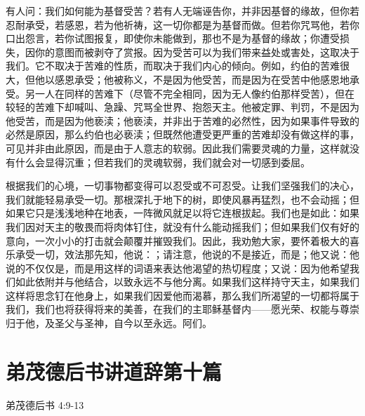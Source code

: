 有人问：我们如何能为基督受苦？若有人无端诬告你，并非因基督的缘故，但你若忍耐承受，若感恩，若为他祈祷，这一切你都是为基督而做。但若你咒骂他，若你口出怨言，若你试图报复，即使你未能做到，那也不是为基督的缘故；你遭受损失，因你的意图而被剥夺了赏报。因为受苦可以为我们带来益处或害处，这取决于我们。它不取决于苦难的性质，而取决于我们内心的倾向。例如，约伯的苦难很大，但他以感恩承受；他被称义，不是因为他受苦，而是因为在受苦中他感恩地承受。另一人在同样的苦难下（尽管不完全相同，因为无人像约伯那样受苦），但在较轻的苦难下却喊叫、急躁、咒骂全世界、抱怨天主。他被定罪、判罚，不是因为他受苦，而是因为他亵渎；他亵渎，并非出于苦难的必然性，因为如果事件导致的必然是原因，那么约伯也必亵渎；但既然他遭受更严重的苦难却没有做这样的事，可见并非由此原因，而是由于人意志的软弱。因此我们需要灵魂的力量，这样就没有什么会显得沉重；但若我们的灵魂软弱，我们就会对一切感到委屈。\par

根据我们的心境，一切事物都变得可以忍受或不可忍受。让我们坚强我们的决心，我们就能轻易承受一切。那根深扎于地下的树，即使风暴再猛烈，也不会动摇；但如果它只是浅浅地种在地表，一阵微风就足以将它连根拔起。我们也是如此：如果我们因对天主的敬畏而将肉体钉住，就没有什么能动摇我们；但如果我们仅有好的意向，一次小小的打击就会颠覆并摧毁我们。因此，我劝勉大家，要怀着极大的喜乐承受一切，效法那先知，他说：；请注意，他说的不是接近，而是；他又说：他说的不仅仅是，而是用这样的词语来表达他渴望的热切程度；又说：因为他希望我们如此依附并与他结合，以致永远不与他分离。如果我们这样持守天主，如果我们这样将思念钉在他身上，如果我们因爱他而渴慕，那么我们所渴望的一切都将属于我们，我们也将获得将来的美善，在我们的主耶稣基督内——愿光荣、权能与尊崇归于他，及圣父与圣神，自今以至永远。阿们。\par



\section{弟茂德后书讲道辞第十篇}

弟茂德后书 4:9-13\par

